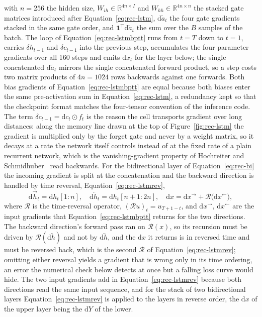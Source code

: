 with $n=256$ the hidden size, $W_{ih}\in\mathbb R^{4n\times I}$ and $W_{hh}\in\mathbb R^{4n\times n}$ the stacked gate matrices introduced after Equation~\ref{eq:rec-lstm}, $\mathrm d\tilde a_t$ the four gate gradients stacked in the same gate order, and $\mathbf 1^{\top}\mathrm d\tilde a_t$ the sum over the $B$ samples of the batch.
The loop of Equation~\ref{eq:rec-lstmbptt} runs from $t=T$ down to $t=1$, carries $\delta h_{t-1}$ and $\delta c_{t-1}$ into the previous step, accumulates the four parameter gradients over all 160 steps and emits $\mathrm dx_t$ for the layer below; the single concatenated $\mathrm d\tilde a_t$ mirrors the single concatenated forward product, so a step costs two matrix products of $4n=1024$ rows backwards against one forwards.
Both bias gradients of Equation~\ref{eq:rec-lstmbptt} are equal because both biases enter the same pre-activation sum in Equation~\ref{eq:rec-lstm}, a redundancy kept so that the checkpoint format matches the four-tensor convention of the inference code.
The term $\delta c_{t-1}=\mathrm dc_t\odot f_t$ is the reason the cell transports gradient over long distances: along the memory line drawn at the top of Figure~\ref{fig:rec-lstm} the gradient is multiplied only by the forget gate and never by a weight matrix, so it decays at a rate the network itself controls instead of at the fixed rate of a plain recurrent network, which is the vanishing-gradient property of Hochreiter and Schmidhuber~\cite{hochreiter1997} read backwards.
For the bidirectional layer of Equation~\ref{eq:rec-bi} the incoming gradient is split at the concatenation and the backward direction is handled by time reversal, Equation~\ref{eq:rec-lstmrev},
\begin{equation}
\mathrm d\overrightarrow h_t=\mathrm dh_t[1{:}n],\quad
\mathrm d\overleftarrow h_t=\mathrm dh_t[n{+}1{:}2n],\quad
\mathrm dx=\mathrm dx^{\rightarrow}+\mathcal R\bigl(\mathrm dx^{\leftarrow}\bigr),
\label{eq:rec-lstmrev}
\end{equation}
where $\mathcal R$ is the time-reversal operator, $(\mathcal Ru)_t=u_{T+1-t}$, and $\mathrm dx^{\rightarrow}$, $\mathrm dx^{\leftarrow}$ are the input gradients that Equation~\ref{eq:rec-lstmbptt} returns for the two directions.
The backward direction's forward pass ran on $\mathcal R(x)$, so its recursion must be driven by $\mathcal R(\mathrm d\overleftarrow h)$ and not by $\mathrm d\overleftarrow h$, and the $\mathrm dx$ it returns is in reversed time and must be reversed back, which is the second $\mathcal R$ of Equation~\ref{eq:rec-lstmrev}; omitting either reversal yields a gradient that is wrong only in its time ordering, an error the numerical check below detects at once but a falling loss curve would hide.
The two input gradients add in Equation~\ref{eq:rec-lstmrev} because both directions read the same input sequence, and for the stack of two bidirectional layers Equation~\ref{eq:rec-lstmrev} is applied to the layers in reverse order, the $\mathrm dx$ of the upper layer being the $\mathrm dY$ of the lower.

